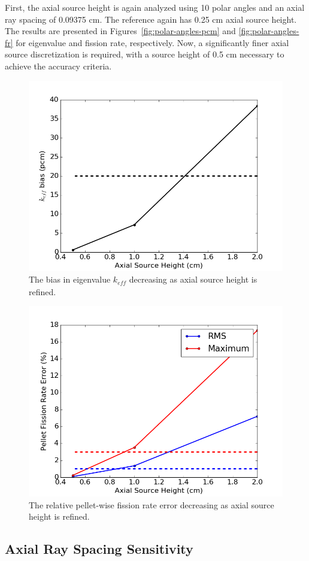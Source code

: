 First, the axial source height is again analyzed using 10 polar angles and an axial ray spacing of 0.09375 cm. The reference again has 0.25 cm axial source height. The results are presented in Figures~\ref{fig:polar-angles-pcm} and \ref{fig:polar-angles-fr} for eigenvalue and fission rate, respectively. Now, a significantly finer axial source discretization is required, with a source height of 0.5 cm necessary to achieve the accuracy criteria.

\begin{figure}[h!]
	\centering
	\includegraphics[width=0.7\linewidth]{figures/results/sensitivity/rodded_source_height_pcm.png}
	\caption[]{The bias in eigenvalue $k_{\textit{eff}}$ decreasing as axial source height is refined.}
	\label{fig:rodded-axial-sh-pcm}
\end{figure}
\begin{figure}[h!]
	\centering
	\includegraphics[width=0.7\linewidth]{figures/results/sensitivity/rodded_source_height_fr.png}
	\caption[]{The relative pellet-wise fission rate error decreasing as axial source height is refined.}
	\label{fig:rodded-axial-sh-fr}
\end{figure}

\subsection{Axial Ray Spacing Sensitivity}


